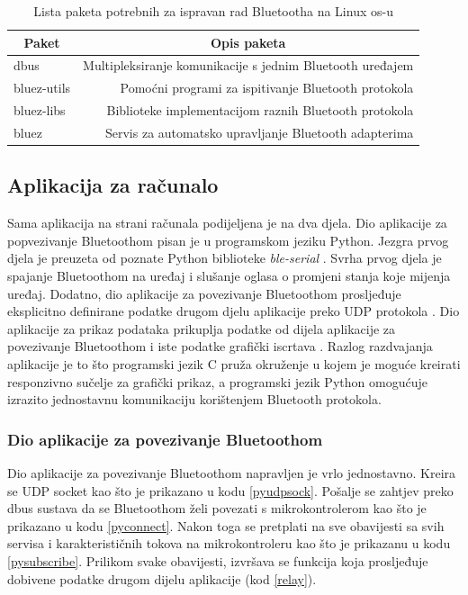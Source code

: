 \documentclass[times, utf8, diplomski]{diplomski}
\begin{document}
\begin{table}[H]
  \begin{center}
    \begin{tabular}[c]{l|r}
      \multicolumn{1}{c|}{\textbf{Paket}} & 
      \multicolumn{1}{c}{\textbf{Opis paketa}} \\
      \hline
      dbus & Multipleksiranje komunikacije s jednim Bluetooth uređajem \\
      bluez-utils & Pomoćni programi za ispitivanje Bluetooth protokola \\
      bluez-libs & Biblioteke implementacijom raznih Bluetooth protokola \\
      bluez & Servis za automatsko upravljanje Bluetooth adapterima \\
      \hline
    \end{tabular}
  \caption{Lista paketa potrebnih za ispravan rad Bluetootha na Linux os-u}
  \end{center}
\end{table}

\subsection{Aplikacija za računalo}
Sama aplikacija na strani računala podijeljena je na dva djela. Dio aplikacije za popvezivanje Bluetoothom pisan je u programskom jeziku Python. Jezgra prvog djela je preuzeta od poznate Python biblioteke \textit{ble-serial} \cite{ble-serial}. Svrha prvog djela je spajanje Bluetoothom na uređaj i slušanje oglasa o promjeni stanja koje mijenja uređaj. Dodatno, dio aplikacije za povezivanje Bluetoothom prosljeđuje eksplicitno definirane podatke drugom djelu aplikacije preko UDP protokola \cite{firstPart}. Dio aplikacije za prikaz podataka prikuplja podatke od dijela aplikacije za povezivanje Bluetoothom i iste podatke grafički iscrtava \cite{secondPart}. Razlog razdvajanja aplikacije je to što programski jezik C pruža okruženje u kojem je moguće kreirati responzivno sučelje za grafički prikaz, a programski jezik Python omogućuje izrazito jednostavnu komunikaciju korištenjem Bluetooth protokola.

\subsubsection{Dio aplikacije za povezivanje Bluetoothom}
Dio aplikacije za povezivanje Bluetoothom napravljen je vrlo jednostavno. Kreira se UDP socket kao što je prikazano u kodu \ref{pyudpsock}. Pošalje se zahtjev preko dbus sustava da se Bluetoothom želi povezati s mikrokontrolerom kao što je prikazano u kodu \ref{pyconnect}. Nakon toga se pretplati na sve obavijesti sa svih servisa i karakterističnih tokova na mikrokontroleru kao što je prikazanu u kodu \ref{pysubscribe}. Prilikom svake obavijesti, izvršava se funkcija koja prosljeđuje dobivene podatke drugom dijelu aplikacije (kod \ref{relay}).
\end{document}
